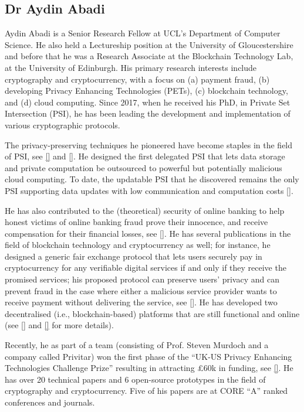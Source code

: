 \subsection{Dr Aydin Abadi}


Aydin Abadi is a Senior Research Fellow at UCL’s Department of Computer Science.  He also held a Lectureship position at the University of Gloucestershire and before that he was a Research Associate at the Blockchain Technology Lab, at the University of Edinburgh. His primary research interests include cryptography and cryptocurrency, with a focus on (a) payment fraud, (b) developing Privacy Enhancing Technologies (PETs), (c) blockchain technology, and (d) cloud computing. Since 2017, when he received his PhD, in Private Set Intersection (PSI), he has been leading the development and implementation of various cryptographic protocols. 

The privacy-preserving techniques he pioneered have become staples in the field of PSI, see \href{https://link.springer.com/chapter/10.1007/978-3-319-18467-8_1}{[\x]} and \href{https://link.springer.com/chapter/10.1007/978-3-662-54970-4_9}{[\x]}. He designed the first delegated PSI that lets data storage and private computation be outsourced to powerful but potentially malicious cloud computing. To date, the updatable PSI that he discovered remains the only PSI supporting data updates with low communication and computation costs \href{https://link.springer.com/chapter/10.1007/978-3-031-18283-9_6}{[\x]}.  


He has also contributed to the (theoretical) security of online banking to help honest victims of online banking fraud prove their innocence, and receive compensation for their financial losses, see \href{https://eprint.iacr.org/2022/107.pdf}{[\x]}. He has several publications in the field of blockchain technology and cryptocurrency as well; for instance, he designed a generic fair exchange protocol that lets users securely pay in cryptocurrency for any verifiable digital services if and only if they receive the promised services; his proposed protocol can preserve users' privacy and can prevent fraud in the case where either a malicious service provider wants to receive payment without delivering the service, see \href{https://arxiv.org/pdf/2208.00283.pdf}{[\x]}. He has developed two decentralised (i.e., blockchain-based) platforms that are still functional and online (see \href{http://blockchainlab.inf.ed.ac.uk/id-management/#/}{[\x]} and \href{http://blockchainlab.inf.ed.ac.uk/valued/}{[\x]} for more details).


Recently, he as part of a team (consisting of Prof. Steven Murdoch and a company called Privitar) won the first phase of the “UK-US Privacy Enhancing Technologies Challenge Prize” resulting in attracting £60k in funding, see \href{https://www.ucl.ac.uk/computer-science/news/2022/dec/ucl-computer-sciences-success-privacy-enhancing-technologies-challenge}{[\x]}.  He has over 20 technical papers and 6 open-source prototypes in the field of cryptography and cryptocurrency. Five of his papers are at CORE “A” ranked conferences and journals.




